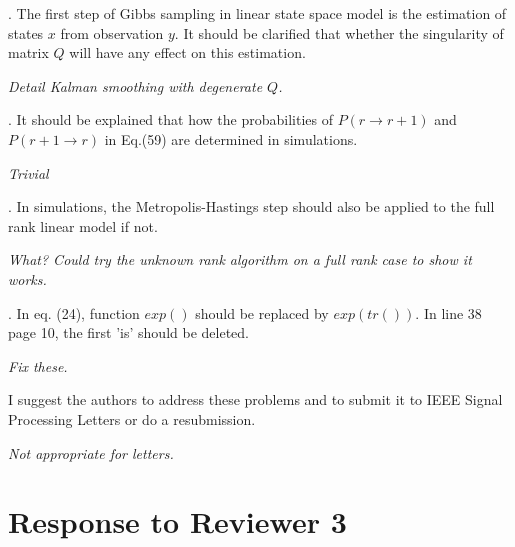 \documentclass{article}
\newenvironment{review}[0]{\begin{itshape}\color{Gray}\noindent}{\end{itshape}\vspace{0.4cm}}
\newenvironment{response}[0]{\noindent}{\vspace{0.4cm}}
\newcommand{\meta}[1]{{\color{red}\em #1}}
\begin{document}
\begin{review}
5.   The first step of Gibbs sampling in linear state space model is the estimation of states $x$ from observation $y$. It should be clarified that whether the singularity of matrix $Q$ will have any effect on this estimation. 
\end{review}

\begin{response}
 \meta{Detail Kalman smoothing with degenerate $Q$.}
\end{response}

\begin{review}
6.  It should be explained that how the probabilities of $P(r \to r+1)$ and $P(r+1 \to r)$ in Eq.(59) are determined in simulations.
\end{review}

\begin{response}
 \meta{Trivial}
\end{response}

\begin{review}
7.  In simulations, the Metropolis-Hastings step should also be applied to the full rank linear model if not. 
\end{review}

\begin{response}
 \meta{What? Could try the unknown rank algorithm on a full rank case to show it works.}
\end{response}

\begin{review}
8.  In eq. (24), function $exp()$ should be replaced by $exp(tr())$. In line 38 page 10, the first 'is' should be deleted.
\end{review}

\begin{response}
 \meta{Fix these.}
\end{response}

\begin{review}
I suggest the authors to address these problems and to submit it to IEEE Signal Processing Letters or do a resubmission.
\end{review}

\begin{response}
 \meta{Not appropriate for letters.}
\end{response}


\section*{Response to Reviewer 3}
\end{document}
